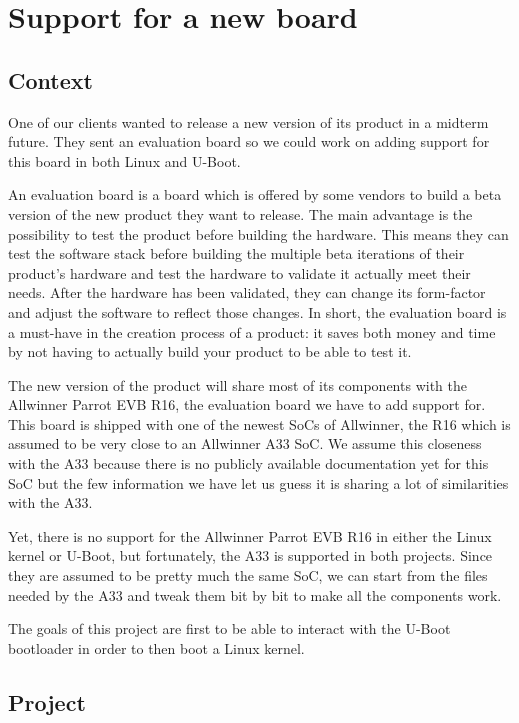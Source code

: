 \chapter{Support for a new board}

\section{Context}
One of our clients wanted to release a new version of its product in a midterm future. They sent an evaluation board so we could work on adding support for this board in both Linux and U-Boot.

An evaluation board is a board which is offered by some vendors to build a beta version of the new product they want to release. The main advantage is the possibility to test the product before building the hardware. This means they can test the software stack before building the multiple beta iterations of their product's hardware and test the hardware to validate it actually meet their needs. After the hardware has been validated, they can change its form-factor and adjust the software to reflect those changes. In short, the evaluation board is a must-have in the creation process of a product: it saves both money and time by not having to actually build your product to be able to test it.

The new version of the product will share most of its components with the Allwinner Parrot EVB R16, the evaluation board we have to add support for. This board is shipped with one of the newest SoCs of Allwinner, the R16 which is assumed to be very close to an Allwinner A33 SoC. We assume this closeness with the A33 because there is no publicly available documentation yet for this SoC but the few information we have let us guess it is sharing a lot of similarities with the A33.

Yet, there is no support for the Allwinner Parrot EVB R16 in either the Linux kernel or U-Boot, but fortunately, the A33 is supported in both projects. Since they are assumed to be pretty much the same SoC, we can start from the files needed by the A33 and tweak them bit by bit to make all the components work.

The goals of this project are first to be able to interact with the U-Boot bootloader in order to then boot a Linux kernel.

\section{Project}

